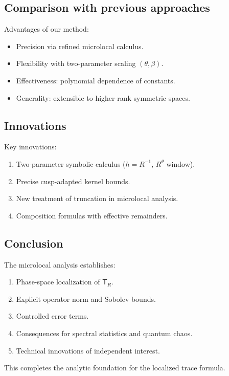 \subsection{Comparison with previous approaches}\label{subsec:micro-comparison}

Advantages of our method:
\begin{itemize}
\item Precision via refined microlocal calculus.
\item Flexibility with two-parameter scaling $(\theta,\beta)$.
\item Effectiveness: polynomial dependence of constants.
\item Generality: extensible to higher-rank symmetric spaces.
\end{itemize}

\subsection{Innovations}\label{subsec:micro-innovations}

Key innovations:
\begin{enumerate}
\item Two-parameter symbolic calculus ($h=R^{-1}$, $R^\theta$ window).
\item Precise cusp-adapted kernel bounds.
\item New treatment of truncation in microlocal analysis.
\item Composition formulas with effective remainders.
\end{enumerate}

\subsection{Conclusion}\label{subsec:micro-conclusion}

The microlocal analysis establishes:
\begin{enumerate}
\item Phase-space localization of $\mathsf{T}_R$.
\item Explicit operator norm and Sobolev bounds.
\item Controlled error terms.
\item Consequences for spectral statistics and quantum chaos.
\item Technical innovations of independent interest.
\end{enumerate}

This completes the analytic foundation for the localized trace formula.
